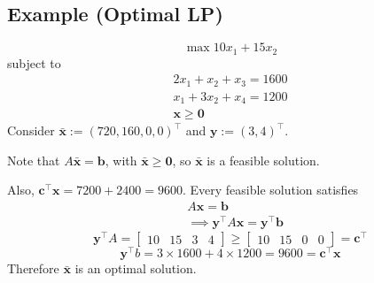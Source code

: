 \subsection{Example (Optimal LP)}
\[\max 10x_1+15x_2\]
subject to
\begin{align*}
    2x_1+x_2+x_3=1600\\
    x_1+3x_2+x_4=1200\\
    \mathbf{x}\ge \mathbf{0}
\end{align*}
Consider $\bar{\mathbf{x}}:=(720,160,0,0)^\top$ and $\mathbf{y}:=(3,4)^\top$.

Note that
$A\bar{\mathbf{x}}=\mathbf{b}$, with $\bar{\mathbf{x}}\ge \mathbf{0}$, 
so $\bar{\mathbf{x}}$ is a feasible solution.


Also, $\mathbf{c}^\top \mathbf{x}=7200+2400=9600$.
Every feasible solution satisfies
\begin{align*}
    &A\mathbf{x}=\mathbf{b}\\
    &\implies \mathbf{y}^\top A\mathbf{x}=\mathbf{y}^\top \mathbf{b}
\end{align*}
\[\mathbf{y}^\top A=
\begin{bmatrix}
    10 & 15 & 3 & 4
\end{bmatrix}
\ge
\begin{bmatrix}
    10 & 15 & 0 & 0
\end{bmatrix}=\mathbf{c}^\top \]
\[\mathbf{y}^\top b=3\times 1600+4\times 1200=9600=\mathbf{c}^\top \mathbf{x}\]
Therefore $\bar{\mathbf{x}}$ is an optimal solution.
